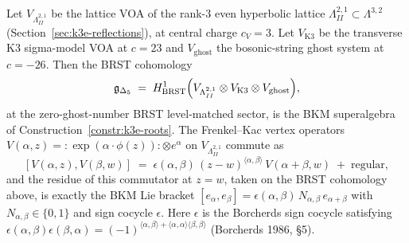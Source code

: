 \begin{theorem}
\label{thm:k3e-frenkel-kac-closure}
Let $V_{\Lambda^{2,1}_{II}}$ be the lattice VOA of the rank-$3$ even hyperbolic
lattice $\Lambda^{2,1}_{II}\subset\Lambda^{3,2}$
(Section~\ref{sec:k3e-reflections}), at central charge $c_V = 3$. Let
$V_{\mathrm{K3}}$ be the transverse K3 sigma-model VOA at $c = 23$ and
$V_{\mathrm{ghost}}$ the bosonic-string ghost system at $c = -26$. Then the BRST
cohomology
\[
 \mathfrak{g}_{\Delta_5}
 \;=\;
 H^1_{\mathrm{BRST}}\Bigl(V_{\Lambda^{2,1}_{II}}\otimes V_{\mathrm{K3}}\otimes
 V_{\mathrm{ghost}}\Bigr),
\]
at the zero-ghost-number BRST level-matched sector, is the BKM superalgebra of
Construction~\ref{constr:k3e-roots}. The Frenkel--Kac vertex operators
$V(\alpha,z) = {:}\exp(\alpha\cdot\phi(z)){:}\otimes e^\alpha$ on
$V_{\Lambda^{2,1}_{II}}$ commute as
\[
 [V(\alpha,z), V(\beta,w)]
 \;=\;
 \epsilon(\alpha,\beta)\,(z-w)^{\langle\alpha,\beta\rangle}\,
 V(\alpha+\beta,w)\;+\;\text{regular},
\]
and the residue of this commutator at $z = w$, taken on the BRST cohomology
above, is exactly the BKM Lie bracket $[e_\alpha,e_\beta] =
\epsilon(\alpha,\beta)\,N_{\alpha,\beta}\,e_{\alpha+\beta}$ with
$N_{\alpha,\beta}\in\{0,1\}$ and sign cocycle $\epsilon$. Here $\epsilon$ is
the Borcherds sign cocycle satisfying
$\epsilon(\alpha,\beta)\epsilon(\beta,\alpha) = (-1)^{\langle\alpha,\beta\rangle
+ \langle\alpha,\alpha\rangle\langle\beta,\beta\rangle}$ (Borcherds 1986, §5).
\end{theorem}

